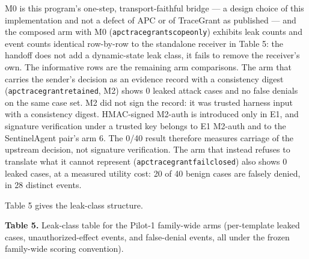 \documentclass[
  10pt,
]{article}
\renewcommand{\_}{\origunderscore\allowbreak}
\begin{document}
M0 is this program's one-step, transport-faithful bridge --- a design
choice of this implementation and not a defect of APC or of TraceGrant
as published --- and the composed arm with M0
(\texttt{apc\_tracegrant\_scope\_only}) exhibits leak counts and event
counts identical row-by-row to the standalone receiver in Table 5: the
handoff does not add a dynamic-state leak class, it fails to remove the
receiver's own. The informative rows are the remaining arm comparisons.
The arm that carries the sender's decision as an evidence record with a
consistency digest (\texttt{apc\_tracegrant\_retained}, M2) shows 0
leaked attack cases and no false denials on the same case set. M2 did
not sign the record: it was trusted harness input with a consistency
digest. HMAC-signed M2-auth is introduced only in E1, and signature
verification under a trusted key belongs to E1 M2-auth and to the
SentinelAgent pair's arm 6. The 0/40 result therefore measures carriage
of the upstream decision, not signature verification. The arm that
instead refuses to translate what it cannot represent
(\texttt{apc\_tracegrant\_fail\_closed}) also shows 0 leaked cases, at a
measured utility cost: 20 of 40 benign cases are falsely denied, in 28
distinct events.

Table 5 gives the leak-class structure.

\textbf{Table 5.} Leak-class table for the Pilot-1 family-wide arms
(per-template leaked cases, unauthorized-effect events, and false-denial
events, all under the frozen family-wide scoring convention).
\end{document}

